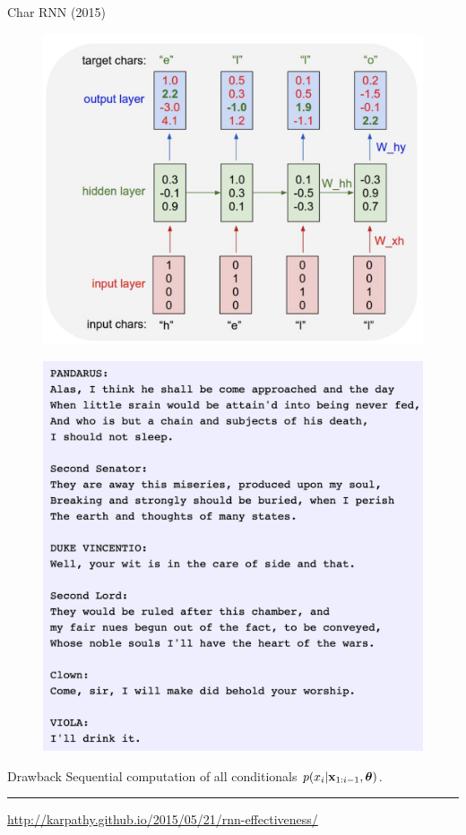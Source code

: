 \begin{frame}{Char RNN (2015)}
	\begin{minipage}[t]{0.55\columnwidth}
		\begin{figure}[h]
			\centering
			\includegraphics[width=1.0\linewidth]{figs/char_rnn.png}
		\end{figure}
	\end{minipage}%
	\begin{minipage}[t]{0.44\columnwidth}
		\begin{figure}[h]
			\centering
			\includegraphics[width=1.0\linewidth]{figs/char_rnn_output.png}
		\end{figure}
	\end{minipage}
	\begin{block}{Drawback}
	Sequential computation of all conditionals $p(x_i | \mathbf{x}_{1:i-1}, \boldsymbol{\theta})$.
	\end{block}
\hrule\medskip
{\scriptsize  \href{http://karpathy.github.io/2015/05/21/rnn-effectiveness/}{http://karpathy.github.io/2015/05/21/rnn-effectiveness/}}
\end{frame}
